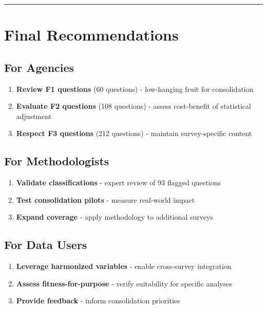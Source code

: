\documentclass[
  letterpaper,
]{report}
\providecommand{\tightlist}{%
  \setlength{\itemsep}{0pt}\setlength{\parskip}{0pt}}
\begin{document}
\begin{center}\rule{0.5\linewidth}{0.5pt}\end{center}

\section{Final Recommendations}\label{final-recommendations}

\subsection{For Agencies}\label{for-agencies}

\begin{enumerate}
\def\labelenumi{\arabic{enumi}.}
\tightlist
\item
  \textbf{Review F1 questions} (60 questions) - low-hanging fruit for
  consolidation
\item
  \textbf{Evaluate F2 questions} (108 questions) - assess cost-benefit
  of statistical adjustment
\item
  \textbf{Respect F3 questions} (212 questions) - maintain
  survey-specific content
\end{enumerate}

\subsection{For Methodologists}\label{for-methodologists}

\begin{enumerate}
\def\labelenumi{\arabic{enumi}.}
\tightlist
\item
  \textbf{Validate classifications} - expert review of 93 flagged
  questions
\item
  \textbf{Test consolidation pilots} - measure real-world impact
\item
  \textbf{Expand coverage} - apply methodology to additional surveys
\end{enumerate}

\subsection{For Data Users}\label{for-data-users-1}

\begin{enumerate}
\def\labelenumi{\arabic{enumi}.}
\tightlist
\item
  \textbf{Leverage harmonized variables} - enable cross-survey
  integration
\item
  \textbf{Assess fitness-for-purpose} - verify suitability for specific
  analyses
\item
  \textbf{Provide feedback} - inform consolidation priorities
\end{enumerate}
\end{document}
